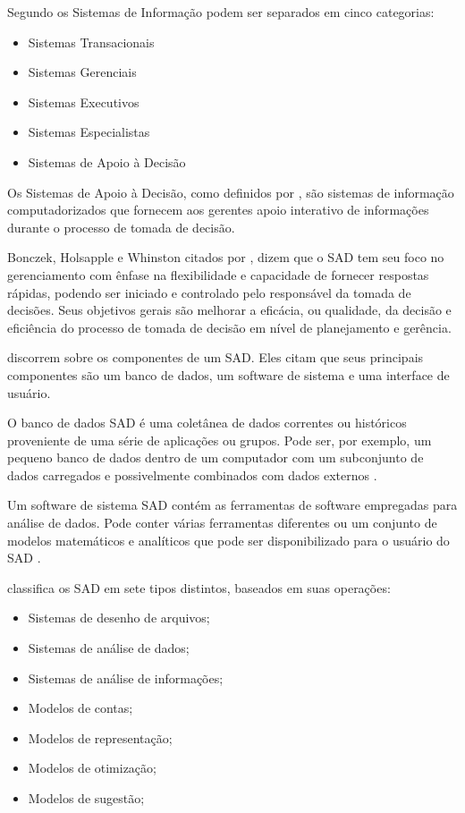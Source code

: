 \documentclass[12pt]{article}
\begin{document}
Segundo  os Sistemas de Informação podem ser
separados em cinco categorias:

\begin{itemize}
    \item Sistemas Transacionais
    \item Sistemas Gerenciais
    \item Sistemas Executivos
    \item Sistemas Especialistas
    \item Sistemas de Apoio à Decisão
\end{itemize}

Os Sistemas de Apoio à Decisão, como definidos por ,
são sistemas de informação computadorizados que fornecem aos gerentes apoio
interativo de informações durante o processo de tomada de decisão.

Bonczek, Holsapple e Whinston citados por , dizem que
o SAD tem seu foco no gerenciamento com ênfase na flexibilidade e capacidade de
fornecer respostas rápidas, podendo ser iniciado e controlado pelo responsável
da tomada de decisões. Seus objetivos gerais são melhorar a eficácia, ou
qualidade, da decisão e eficiência do processo de tomada de decisão em nível de
planejamento e gerência.

 discorrem sobre os componentes de um SAD. Eles
citam que seus principais componentes são um banco de dados, um software de
sistema e uma interface de usuário.

O banco de dados SAD é uma coletânea de dados correntes ou históricos
proveniente de uma série de aplicações ou grupos. Pode ser, por exemplo, um
pequeno banco de dados dentro de um computador com um subconjunto de dados
carregados e possivelmente combinados com dados externos
\cite{kenneth2011sistemas}.

Um software de sistema SAD contém as ferramentas de software empregadas para
análise de dados. Pode conter várias ferramentas diferentes ou um conjunto de
modelos matemáticos e analíticos que pode ser disponibilizado para o usuário do
SAD \cite{kenneth2011sistemas}.

 classifica os SAD em sete tipos distintos,
baseados em suas operações:

\begin{itemize}
  \item Sistemas de desenho de arquivos;
  \item Sistemas de análise de dados;
  \item Sistemas de análise de informações;
  \item Modelos de contas;
  \item Modelos de representação;
  \item Modelos de otimização;
  \item Modelos de sugestão;
\end{itemize}
\end{document}
